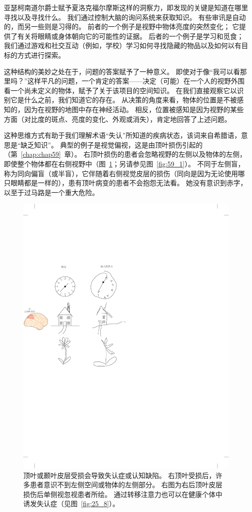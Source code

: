亚瑟柯南道尔爵士赋予夏洛克福尔摩斯这样的洞察力，即发现的关键是知道在哪里寻找以及寻找什么。
我们通过控制大脑的询问系统来获取知识。
有些审讯是自动的，而另一些则是习得的。
前者的一个例子是视野中物体亮度的突然变化；
它提供了有关将眼睛或身体朝向它的可能性的证据。
后者的一个例子是学习和觅食；
我们通过游戏和社交互动（例如，学校）学习如何寻找隐藏的物品以及如何以有目标的方式进行探索。


这种结构的美妙之处在于，问题的答案赋予了一种意义。
即使对于像“我可以看那里吗？”这样平凡的问题，一个肯定的答案——决定（可能）在一个人的视野外围看一个尚未定义的物体，赋予了关于该项目的空间知识。
在我们直接观察它以识别它是什么之前，我们知道它的存在。
从决策的角度来看，物体的位置是不被感知的，因为在视野的地图中存在神经活动。
相反，位置被感知是因为视野的某些方面（对比度的斑点、亮度的变化、外观或消失），肯定地回答了上述问题。


这种思维方式有助于我们理解术语“失认”所知道的疾病状态，该词来自希腊语，意思是“缺乏知识”。
典型的例子是视觉偏视，这是由顶叶损伤引起的（第~\ref{chap:chap59}~章）。
右顶叶损伤的患者会忽略视野的左侧以及物体的左侧，即使整个物体都在右侧视野中（图~\ref{fig:56_10}；另请参见图~\ref{fig:59_1}）。
不同于左侧盲，称为同向偏盲（或半盲），它伴随着右侧视觉皮层的损伤（同向是因为无论使用哪只眼睛都是一样的），患有顶叶病变的患者不会抱怨无法看。
她没有意识到赤字，以至于过马路是一个重大危险。


\begin{figure}[htbp]
	\centering
	\includegraphics[width=0.75\linewidth]{chap56/fig_56_10}
	\caption{顶叶或颞叶皮层受损会导致失认症或认知缺陷。
		右顶叶受损后，许多患者意识不到左侧空间或物体的左侧部分。
		右图为右后顶叶皮层损伤后单侧视忽视患者所绘。
		通过转移注意力也可以在健康个体中诱发失认症（见图~\ref{fig:25_8}）。}
	\label{fig:56_10}
\end{figure}


